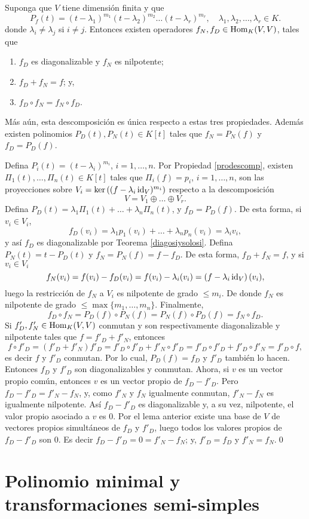 \begin{teo}\label{descjorche}
Suponga que $V$ tiene dimensi\'on finita y que
\[
P_f(t)=(t-\lambda_1)^{m_1}(t-\lambda_2)^{m_2}\ldots(t-\lambda_r)^{m_r}, \quad \lambda_1,\lambda_2,\ldots,\lambda_r\in K.
\]
donde $\lambda_i\ne\lambda_j$ si $i\ne j$. Entonces existen operadores $f_N,f_D\in\operatorname{Hom}_K(V,V)$, tales que
\begin{enumerate}
\item $f_D$ es diagonalizable y $f_N$ es nilpotente;
\item $f_D+f_N=f$; y,
\item $f_D\circ f_N=f_N\circ f_D$.
\end{enumerate}
M\'as a\'un, esta descomposici\'on es \'unica respecto a estas tres propiedades. Adem\'as existen polinomios $P_D(t),P_N(t)\in K[t]$ tales que $f_N=P_N(f)$ y $f_D=P_D(f)$.
\end{teo}

\dem Defina $P_i(t)=(t-\lambda_i)^{m_i}$, $i=1,\ldots,n$. Por Propiedad \ref{prodescomp}, existen $\Pi_1(t),\ldots,\Pi_n(t)\in K[t]$ tales que $\Pi_i(f)=p_i$, $i=1,\ldots,n$, son las proyecciones sobre $V_i=\ker\left((f-\lambda_i\operatorname{id}_V)^{m_i}\right)$ respecto a la descomposici\'on 
\[
V=V_1\oplus \ldots \oplus V_r.
\]
Defina $P_D(t)=\lambda_1\Pi_1(t)+\ldots+\lambda_n\Pi_n(t)$, y $f_D=P_D(f)$. De esta forma, si $v_i\in V_i$,
\[
f_D(v_i)=\lambda_1p_1(v_i)+\ldots+\lambda_np_n(v_i)=\lambda_iv_i,
\]
y as\'i $f_D$ es diagonalizable por Teorema \ref{diagosiysolosi}. Defina $P_N(t)=t-P_D(t)$ y $f_N=P_N(f)=f-f_D$. De esta forma, $f_D+f_N=f$, y si $v_i\in V_i$
\[
f_N(v_i)=f(v_i)-f_D(v_i)=f(v_i)-\lambda_i(v_i)=\left(f-\lambda_i\operatorname{id}_V\right)(v_i),
\]
luego la restricci\'on de $f_N$ a $V_i$ es nilpotente de grado $\le m_i$. De donde $f_N$ es nilpotente de grado $\le\max\{m_1,\ldots,m_n\}$. Finalmente,
\[
f_D\circ f_N=P_D(f)\circ P_N(f)=P_N(f)\circ P_D(f)=f_N\circ f_D.
\]
Si $f'_D,f'_N\in\operatorname{Hom}_K(V,V)$ conmutan y son respectivamente diagonalizable y nilpotente tales que $f=f'_D+f'_N$, entonces
\[
f\circ f'_D=(f'_D+f'_N)f'_D=f'_D\circ f'_D+f'_N\circ f'_D=f'_D\circ f'_D+f'_D\circ f'_N=f'_D\circ f,
\]
es decir $f$ y $f'_D$ conmutan. Por lo cual, $P_D(f)=f_D$ y $f'_D$ tambi\'en lo hacen.\\
Entonces $f_D$ y $f'_D$ son diagonalizables y conmutan. Ahora, si $v$ es un vector propio com\'un, entonces $v$ es un vector propio de $f_D-f'_D$. Pero $f_D-f'_D=f'_N-f_N$, y, como $f'_N$ y $f_N$ igualmente conmutan, $f'_N-f_N$ es igualmente nilpotente. As\'i $f_D-f'_D$ es diagonalizable y, a su vez, nilpotente, el valor propio asociado a $v$ es $0$. Por el lema anterior existe una base de $V$ de vectores propios simult\'aneos de $f_D$ y $f'_D$, luego todos los valores propios de $f_D-f'_D$ son $0$. Es decir $f_D-f'_D=0=f'_N-f_N$; y, $f'_D=f_D$ y $f'_N=f_N$.\qed

\section{Polinomio minimal y transformaciones semi-simples} 